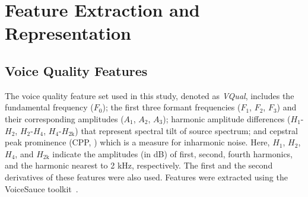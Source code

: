 \section{Feature Extraction and Representation}
\subsection{Voice Quality Features}

The voice quality feature set used in this study, denoted as \textit{VQual}, includes the fundamental frequency ($F_0$); the first three formant frequencies ($F_1$, $F_2$, $F_3$) and their corresponding amplitudes ($A_1$, $A_2$, $A_3$); harmonic amplitude differences ($H_1$-$H_2$, $H_2$-$H_4$, $H_4$-$H_\mathrm{2k}$) that represent spectral tilt of source spectrum; and cepstral peak prominence (CPP, \cite{Hillenbrand1994}) which is a measure for inharmonic noise. Here, $H_1$, $H_2$, $H_4$, and $H_\mathrm{2k}$ indicate the amplitudes (in dB) of first, second, fourth harmonics, and the harmonic nearest to 2 kHz, respectively. The first and the second derivatives of these features were also used. Features were extracted using the VoiceSauce toolkit~\cite{shue2010voice}.




